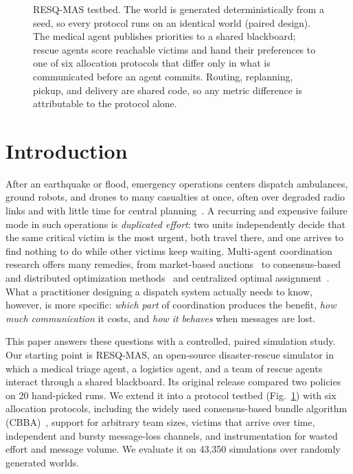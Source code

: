 \documentclass[conference]{IEEEtran}
\begin{document}
\begin{figure}[!t]
{}
\caption{RESQ-MAS testbed. The world is generated deterministically from a seed, so every protocol runs on an identical world (paired design). The medical agent publishes priorities to a shared blackboard; rescue agents score reachable victims and hand their preferences to one of six allocation protocols that differ only in what is communicated before an agent commits. Routing, replanning, pickup, and delivery are shared code, so any metric difference is attributable to the protocol alone.}
\label{fig:arch}
\end{figure}

\section{Introduction}
After an earthquake or flood, emergency operations centers dispatch ambulances, ground robots, and drones to many casualties at once, often over degraded radio links and with little time for central planning~\cite{queralta2020,drew2021}. A recurring and expensive failure mode in such operations is \emph{duplicated effort}: two units independently decide that the same critical victim is the most urgent, both travel there, and one arrives to find nothing to do while other victims keep waiting. Multi-agent coordination research offers many remedies, from market-based auctions~\cite{quinton2023} to consensus-based and distributed optimization methods~\cite{buckman2019,chopra2017} and centralized optimal assignment~\cite{chakraa2023}. What a practitioner designing a dispatch system actually needs to know, however, is more specific: \emph{which part} of coordination produces the benefit, \emph{how much communication} it costs, and \emph{how it behaves} when messages are lost.

This paper answers these questions with a controlled, paired simulation study. Our starting point is RESQ-MAS, an open-source disaster-rescue simulator in which a medical triage agent, a logistics agent, and a team of rescue agents interact through a shared blackboard. Its original release compared two policies on 20 hand-picked runs. We extend it into a protocol testbed (Fig.~\ref{fig:arch}) with six allocation protocols, including the widely used consensus-based bundle algorithm (CBBA)~\cite{buckman2019}, support for arbitrary team sizes, victims that arrive over time, independent and bursty message-loss channels, and instrumentation for wasted effort and message volume. We evaluate it on 43,350 simulations over randomly generated worlds.
\end{document}
